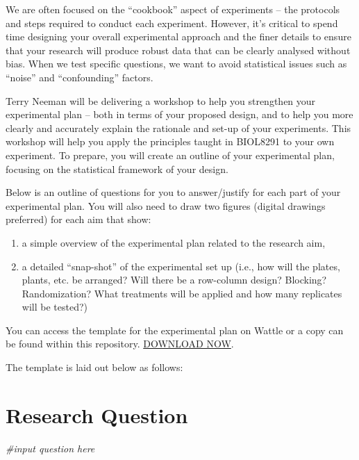 \documentclass[
]{book}
\newenvironment{Shaded}{\begin{snugshade}}{\end{snugshade}}
\newcommand{\CommentTok}[1]{\textcolor[rgb]{0.56,0.35,0.01}{\textit{#1}}}
\begin{document}
We are often focused on the ``cookbook'' aspect of experiments -- the protocols and steps required to conduct each experiment. However, it's critical to spend time designing your overall experimental approach and the finer details to ensure that your research will produce robust data that can be clearly analysed without bias. When we test specific questions, we want to avoid statistical issues such as ``noise'' and ``confounding'' factors.

Terry Neeman will be delivering a workshop to help you strengthen your experimental plan -- both in terms of your proposed design, and to help you more clearly and accurately explain the rationale and set-up of your experiments. This workshop will help you apply the principles taught in BIOL8291 to your own experiment. To prepare, you will create an outline of your experimental plan, focusing on the statistical framework of your design.

Below is an outline of questions for you to answer/justify for each part of your experimental plan. You will also need to draw two figures (digital drawings preferred) for each aim that show:

\begin{enumerate}
\def\labelenumi{\arabic{enumi})}
\item
  a simple overview of the experimental plan related to the research aim,
\item
  a detailed ``snap-shot'' of the experimental set up (i.e., how will the plates, plants, etc. be arranged? Will there be a row-column design? Blocking? Randomization? What treatments will be applied and how many replicates will be tested?)
\end{enumerate}

You can access the template for the experimental plan on Wattle or a copy can be found within this repository. \href{\%22pdfs/3.\%20Statistical\%20Methods\%20in\%20Biology\%20-\%20Chapter\%203.pdf\%22}{DOWNLOAD NOW}.

The template is laid out below as follows:

\hypertarget{research-question}{%
\section{Research Question}\label{research-question}}

\begin{Shaded}
\begin{Highlighting}[]
\CommentTok{\#input question here}
\end{Highlighting}
\end{Shaded}
\end{document}
